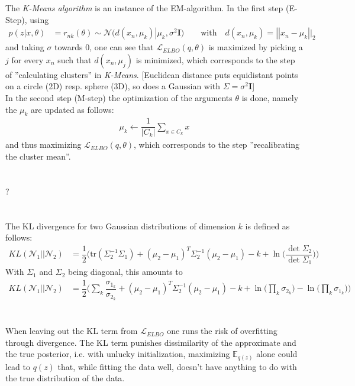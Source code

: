\documentclass[11pt]{article}
\newcommand{\exercise}{\section{}}
\begin{document}
\noindent The \textit{K-Means algorithm} is an instance of the EM-algorithm. In the first step (E-Step), using
\begin{align*}
	p(z|x,\theta) &= r_{nk}(\theta) \sim \mathcal{N}(d(x_n, \mu_k) | \mu_k, \sigma^2 \boldsymbol{I})
	\quad\quad \text{with}\quad d(x_n, \mu_k) = ||x_n - \mu_k||_2
\end{align*}
and taking $\sigma$ towards $0$, one can see that $\mathcal{L}_{ELBO}(q, \theta)$ is maximized by picking a $j$ for every $x_n$ such that $d(x_n, \mu_j)$ is minimized, which corresponds to the step of ''calculating clusters'' in \textit{K-Means}. [Euclidean distance puts equidistant points on a circle (2D) resp. sphere (3D), so does a Gaussian with $\Sigma = \sigma^2 \boldsymbol{I}$]\\

\noindent In the second step (M-step) the optimization of the arguments $\theta$ is done, namely the $\mu_k$ are updated as follows:
\begin{align*}
	\mu_k \leftarrow \dfrac{1}{|C_k|} \sum_{x \in C_k} x
\end{align*}
and thus maximizing $\mathcal{L}_{ELBO}(q, \theta)$, which corresponds to the step ''recalibrating the cluster mean''.

\exercise
?

\exercise
The KL divergence for two Gaussian distributions of dimension $k$ is defined as follows:
\begin{align*}
	KL(\mathcal{N}_1 || \mathcal{N}_2) &= \dfrac{1}{2} \Big(\text{tr}(\Sigma_2^{-1}\Sigma_1) + (\mu_2 - \mu_1)^T \Sigma_2^{-1}(\mu_2 - \mu_1) - k + \ln\big(\dfrac{\det \Sigma_2}{\det \Sigma_1}\big)\Big)
\end{align*}
With $\Sigma_1$ and $\Sigma_2$ being diagonal, this amounts to
\begin{align*}
	KL(\mathcal{N}_1 || \mathcal{N}_2) &= \dfrac{1}{2} \Big(\sum_k \dfrac{\sigma_{1_k}}{\sigma_{2_k}} + (\mu_2 - \mu_1)^T \Sigma_2^{-1}(\mu_2 - \mu_1) - k + \ln\big(\prod_k \sigma_{2_k}{}\big) - \ln\big(\prod_k \sigma_{1_k}\big)\Big)
\end{align*}

\exercise
When leaving out the KL term from $\mathcal{L}_{ELBO}$ one runs the risk of overfitting through divergence. The KL term punishes dissimilarity of the approximate and the true posterior, i.e. with unlucky initialization, maximizing $\mathbb{E}_{q(z)}$ alone could lead to $q(z)$ that, while fitting the data well, doesn't have anything to do with the true distribution of the data.
\end{document}
